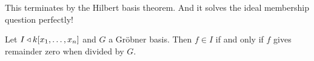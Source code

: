 \documentclass{../../template/note}
\begin{document}
    This terminates by the Hilbert basis theorem. And it solves the ideal membership question perfectly!
    
    \begin{theorem}
        Let $I \triangleleft k[x_1, \dots, x_n]$ and $G$ a Gr\"obner basis. Then $f \in I$ if and only if $f$ gives remainder zero when divided by $G$.
    \end{theorem}
    
    
    
    
    
    
\end{document}
